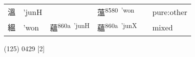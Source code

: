 \documentclass[14pt,a4paper]{scrartcl}
\begin{document}
\begin{longtable}[c]{@{}llllll@{}}
\begin{minipage}[t]{0.14\columnwidth}
溫
\strut\end{minipage} &
\begin{minipage}[t]{0.14\columnwidth}\raggedright\strut
'junH
\strut\end{minipage} &
\begin{minipage}[t]{0.14\columnwidth}\raggedright\strut
\strut\end{minipage} &
\begin{minipage}[t]{0.14\columnwidth}\raggedright\strut
薀\textsuperscript{8580~'won}
\strut\end{minipage} &
\begin{minipage}[t]{0.14\columnwidth}\raggedright\strut
\strut\end{minipage} &
\begin{minipage}[t]{0.14\columnwidth}\raggedright\strut
pure:other
\strut\end{minipage}\tabularnewline
\begin{minipage}[t]{0.14\columnwidth}\raggedright\strut
縕
\strut\end{minipage} &
\begin{minipage}[t]{0.14\columnwidth}\raggedright\strut
'won
\strut\end{minipage} &
\begin{minipage}[t]{0.14\columnwidth}\raggedright\strut
蘊\textsuperscript{860a~'junH}
\strut\end{minipage} &
\begin{minipage}[t]{0.14\columnwidth}\raggedright\strut
蘊\textsuperscript{860a~'junX}
\strut\end{minipage} &
\begin{minipage}[t]{0.14\columnwidth}\raggedright\strut
\strut\end{minipage} &
\begin{minipage}[t]{0.14\columnwidth}\raggedright\strut
mixed
\strut\end{minipage}\tabularnewline
\bottomrule
\end{longtable}

(125) 0429 {[}2{]}
\end{document}
